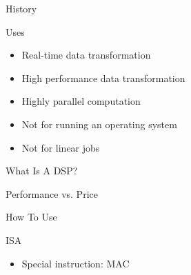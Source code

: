 \documentclass{beamer}
\begin{document}
\begin{slide}{History}
\end{slide}

\begin{slide}{Uses}
    \begin{itemize}
        \item Real-time data transformation %
        \item High performance data transformation %
        \item Highly parallel computation %
        \item Not for running an operating system
        \item Not for linear jobs
    \end{itemize}
\end{slide}

\begin{slide}{What Is A DSP?}
\end{slide}

\begin{slide}{Performance vs. Price}
\end{slide}

\begin{slide}{How To Use}
\end{slide}

\begin{slide}{ISA}
    \begin{itemize}
        \item Special instruction: MAC
    \end{itemize}
\end{slide}
\end{document}
